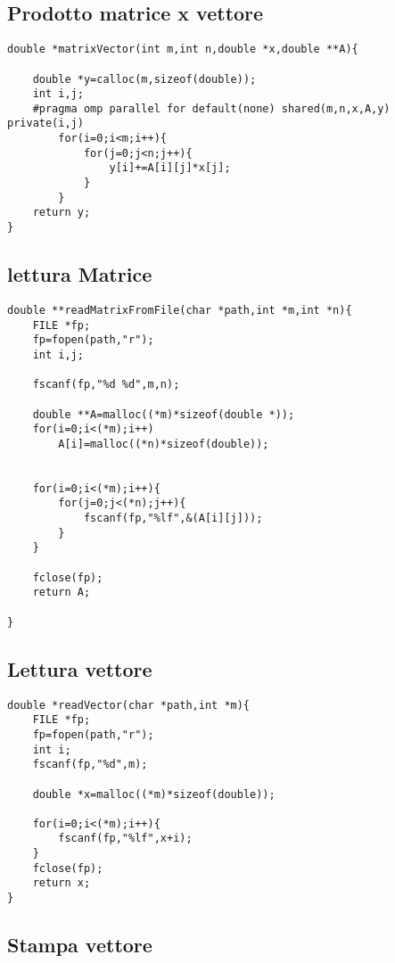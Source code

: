 \documentclass{article}
\begin{document}
\subsection{Prodotto matrice x vettore}

\begin{lstlisting}
double *matrixVector(int m,int n,double *x,double **A){
    
    double *y=calloc(m,sizeof(double));
    int i,j;
    #pragma omp parallel for default(none) shared(m,n,x,A,y) private(i,j)
        for(i=0;i<m;i++){
            for(j=0;j<n;j++){
                y[i]+=A[i][j]*x[j];
            }
        }
    return y;
}
\end{lstlisting}


\subsection{lettura Matrice}

\begin{lstlisting}
double **readMatrixFromFile(char *path,int *m,int *n){
    FILE *fp;
    fp=fopen(path,"r");
    int i,j;

    fscanf(fp,"%d %d",m,n);

    double **A=malloc((*m)*sizeof(double *));
    for(i=0;i<(*m);i++)
        A[i]=malloc((*n)*sizeof(double));

    
    for(i=0;i<(*m);i++){
        for(j=0;j<(*n);j++){
            fscanf(fp,"%lf",&(A[i][j]));
        }
    }

    fclose(fp);
    return A;

}
\end{lstlisting}

\subsection{Lettura vettore}

\begin{lstlisting}
double *readVector(char *path,int *m){
    FILE *fp;
    fp=fopen(path,"r");
    int i;
    fscanf(fp,"%d",m);

    double *x=malloc((*m)*sizeof(double));

    for(i=0;i<(*m);i++){
        fscanf(fp,"%lf",x+i);
    }
    fclose(fp);
    return x;
}
\end{lstlisting}

\subsection{Stampa vettore}
\end{document}
